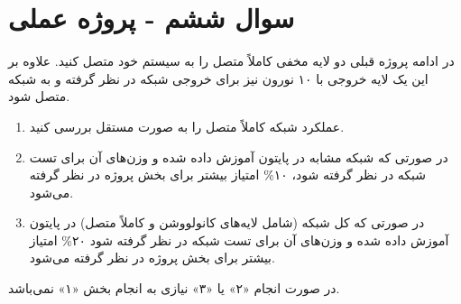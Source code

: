 \section{سوال ششم - پروژه عملی}


در ادامه پروژه قبلی دو لایه مخفی کاملاً متصل را به سیستم خود متصل کنید. علاوه بر این یک لایه خروجی با ۱۰ نورون نیز برای خروجی شبکه در نظر گرفته و به شبکه متصل شود.



\begin{enumerate}
	\item عملکرد شبکه کاملاً متصل را به صورت مستقل بررسی کنید.
	\item در صورتی که شبکه مشابه در پایتون آموزش داده شده و وزن‌های آن برای تست شبکه در نظر گرفته شود، ۱۰\% امتیاز بیشتر برای بخش پروژه در نظر گرفته می‌شود.
	\item در صورتی که کل شبکه (شامل لایه‌های کانولووشن و کاملاً متصل) در پایتون آموزش داده شده و وزن‌های آن برای تست شبکه در نظر گرفته شود ۲۰\% امتیاز بیشتر برای بخش پروژه در نظر گرفته می‌شود.
\end{enumerate}

	
	در صورت انجام «۲» یا «۳» نیازی به انجام بخش «۱» نمی‌باشد.
	

